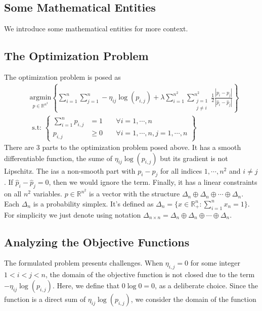 \documentclass[11pt]{article}
\theoremstyle{definition}
\numberwithin{equation}{subsection}
\begin{document}
    \subsection{Some Mathematical Entities}
        We introduce some mathematical entities for more context. 

    \subsection{The Optimization Problem}
    The optimization problem is posed as 
        \begin{align}
            &\underset{p \in \mathbb R^{n^2}}{\text{argmin}} 
            \left\lbrace
                \sum_{i = 1}^{n}\sum_{j = 1}^{n}
                    -\eta_{ij}\log(p_{i, j})
                + 
                \lambda \sum_{i=1}^{n^2}\sum_{\substack{j=1\\j\neq i}}^{n^2}
                \frac{1}{2}
                \frac{|p_{i} - p_j|}{|\hat p_{i} - \hat p_j|}
                \right\rbrace
                \\
                &\text{ s.t: }
                \left\lbrace
                \begin{aligned}
                    \sum_{i = 1}^{n} p_{i, j} &= 1 \; && \forall i =1, \cdots, n 
                    \\
                    p_{i, j} &\ge 0\; &&\forall i= 1,\cdots, n, j = 1,\cdots, n 
                \end{aligned}
                \right\rbrace
            \label{eqn:original_formulaion}
        \end{align}
        There are 3 parts to the optimization problem posed above. 
        It has a smooth differentiable function, the sume of $\eta_{ij}\log(p_{i,j})$ but its gradient is not Lipschitz. 
        The ias a non-smooth part with $p_i - p_j$ for all indices $1,\cdots, n^2$ and $i\neq j$. 
        If $\hat p_i - \hat p_j = 0$, then we would ignore the term. 
        Finally, it has a linear constraints on all $n^2$ variables. 
        $p\in \mathbb R^{n^2}$ is a vector with the structure $\Delta_n\oplus\Delta_n\oplus \cdots \oplus \Delta_n$. 
        Each $\Delta_n$ is a probability simplex. 
        It's defined as $\Delta_n = \{x\in \mathbb R^n_+ : \sum_{i =1}^{n}x_n = 1\}$. 
        For simplicity we just denote using notation $\Delta_{n\times n} = \Delta_n\oplus\Delta_n\oplus \cdots \oplus \Delta_n$. 
    
    \subsection{Analyzing the Objective Functions}
        The formulated problem presents challenges. 
        When $\eta_{i, j} = 0$ for some integer $1<  i < j <n$, the domain of the objective function is not closed due to the term $-\eta_{ij} \log(p_{i, j})$. 
        Here, we define that $0 \log 0 = 0$, as a deliberate choice. 
        Since the function is a direct sum of $\eta_{ij}\log(p_{i, j})$, we consider the domain of the function 
        \begin{align*}
        \end{align*}
\end{document}
